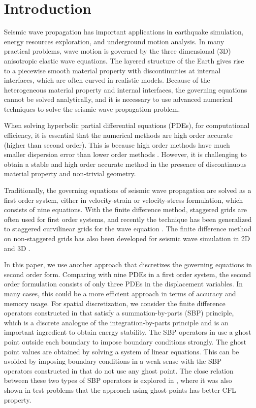 \section{Introduction}
Seismic wave propagation has important applications in earthquake simulation, energy resources exploration, and underground motion analysis. In many practical problems, wave motion is governed by the three dimensional (3D) anisotropic elastic wave equations. The layered structure of the Earth gives rise to a piecewise smooth material property with discontinuities at internal interfaces, which are often curved in realistic models. Because of the heterogeneous material property and internal interfaces, the governing equations cannot be solved analytically, and it is necessary to use advanced numerical techniques to solve the seismic wave propagation problem.

When solving hyperbolic partial differential equations (PDEs), for computational efficiency, it is essential that the numerical methods are high order accurate (higher than second order). This is because high order methods have much smaller dispersion error than lower order methods \cite{Hagstrom2012,Kreiss1972}. However, it is challenging to obtain a stable and high order accurate method in the presence of discontinuous material property and non-trivial geometry. 

Traditionally, the governing equations of seismic wave propagation are solved as a first order system, either in velocity-strain or velocity-stress formulation, which consists of nine equations. With the finite difference method, staggered grids are often used for first order systems, and recently the technique has been generalized to staggered curvilinear grids for the wave equation \cite{OReilly2020}. The finite difference method on non-staggered grids has also been developed for seismic wave simulation in 2D \cite{Kozdon2013} and 3D \cite{Duru2016}.

In this paper, we use another approach that discretizes the governing equations in second order form. Comparing with nine PDEs in a first order system, the second order formulation consists of only three PDEs in the displacement variables. In many cases, this could be a more efficient approach in terms of accuracy and memory usage. For spatial discretization, we consider the finite difference operators constructed in \cite{sjogreen2012fourth} that satisfy a summation-by-parts (SBP) principle, which is a discrete analogue of the integration-by-parts principle and is an important ingredient to obtain energy stability. The SBP operators in \cite{sjogreen2012fourth} use a ghost point outside each boundary to impose boundary conditions strongly. The ghost point values are obtained by solving a system of linear equations. This can be avoided by imposing boundary conditions in a weak sense \cite{Carpenter1994} with the SBP operators constructed in \cite{Mattsson2012} that do not use any ghost point. The close  relation between these two types of SBP operators is explored in \cite{wang2018fourth}, where it was also shown in test problems that the approach using ghost points has better CFL property.

